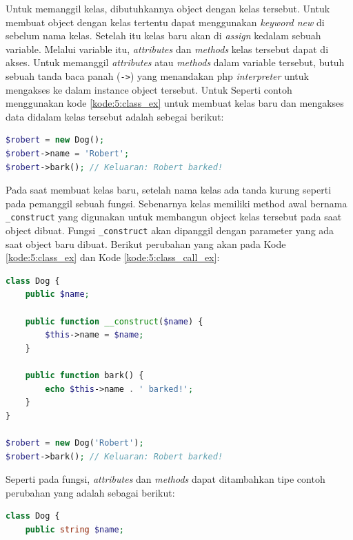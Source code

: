 \documentclass[a4paper,twoside]{article}
\begin{document}
\begin{enumerate}
\begin{itemize}
		            Untuk memanggil kelas, dibutuhkannya object dengan kelas tersebut.  Untuk membuat object dengan kelas tertentu dapat menggunakan \textit{keyword new} di sebelum nama kelas. Setelah itu kelas baru akan di \textit{assign} kedalam sebuah variable. Melalui variable itu, \textit{attributes} dan \textit{methods} kelas tersebut dapat di akses.
		            Untuk memanggil \textit{attributes} atau \textit{methods} dalam variable tersebut, butuh sebuah tanda baca panah (\verb|->|) yang menandakan php \textit{interpreter} untuk mengakses ke dalam instance object tersebut. Untuk
		            Seperti contoh menggunakan kode \ref{kode:5:class_ex} untuk membuat kelas baru dan mengakses data didalam kelas tersebut adalah sebegai berikut:

		            \begin{lstlisting}[language={php}, caption={Contoh Pemanggilan Kelas}, label={kode:5:class_call_ex}]
$robert = new Dog();
$robert->name = 'Robert';
$robert->bark(); // Keluaran: Robert barked!
					\end{lstlisting}

		            Pada saat membuat kelas baru, setelah nama kelas ada tanda kurung seperti pada pemanggil sebuah fungsi. Sebenarnya kelas memiliki method awal bernama \verb|_construct| yang digunakan untuk membangun object kelas tersebut pada saat object dibuat. Fungsi \verb|_construct| akan dipanggil dengan parameter yang ada saat object baru dibuat. Berikut perubahan yang akan pada Kode \ref{kode:5:class_ex} dan Kode \ref{kode:5:class_call_ex}:

		            \begin{lstlisting}[language={php}, caption={Contoh Kelas}, label={kode:5:class_ex}]
class Dog {
	public $name;
	
	public function __construct($name) {
        $this->name = $name;
  	}
	
	public function bark() {
		echo $this->name . ' barked!';
	}
}

$robert = new Dog('Robert');
$robert->bark(); // Keluaran: Robert barked!
					\end{lstlisting}

		            Seperti pada fungsi, \textit{attributes} dan \textit{methods} dapat ditambahkan tipe contoh perubahan yang adalah sebagai berikut:

		            \begin{lstlisting}[language={php}, caption={Contoh Kelas}, label={kode:5:class_ex}]
class Dog {
	public string $name;
	

\end{lstlisting}
\end{itemize}
\end{enumerate}
\end{document}

